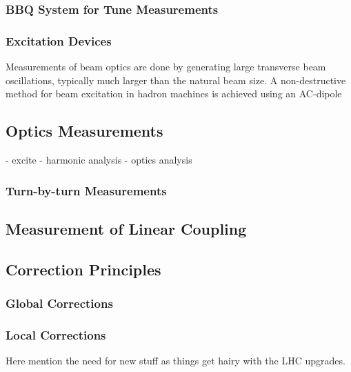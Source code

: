 
\subsubsection{BBQ System for Tune Measurements}

\subsubsection{Excitation Devices}


Measurements of beam optics are done by generating large transverse beam oscillations, typically much larger than the natural beam size.
A non-destructive method for beam excitation in hadron machines is achieved using an AC-dipole

\subsection{Optics Measurements}
\label{subsection:optics_measurements}

- excite
- harmonic analysis
- optics analysis

\subsubsection{Turn-by-turn Measurements}

\subsection{Measurement of Linear Coupling}

\subsection{Correction Principles}

\subsubsection{Global Corrections}

\subsubsection{Local Corrections}

Here mention the need for new stuff as things get hairy with the LHC upgrades.